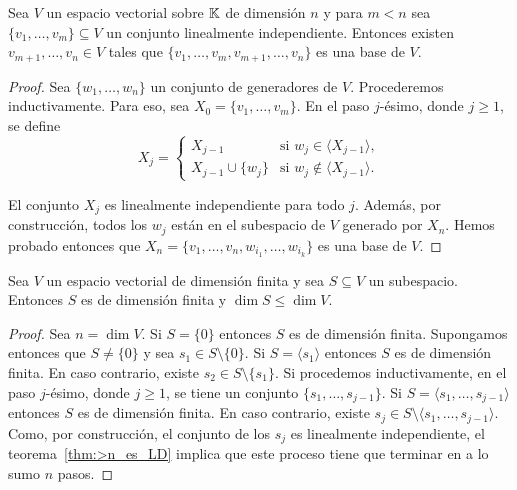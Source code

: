 \begin{prop}
	\label{pro:extender_a_una_base}
	Sea $V$ un espacio vectorial sobre $\mathbb{K}$ de dimensión $n$ y para $m<n$ sea
	$\{v_1,\dots,v_m\}\subseteq V$ un conjunto linealmente independiente.
	Entonces existen $v_{m+1},\dots,v_n\in V$ tales que
	$\{v_1,\dots,v_m,v_{m+1},\dots,v_n\}$ es una base de $V$.

	\begin{proof}
		Sea $\{w_1,\dots,w_n\}$ un conjunto de generadores de $V$.
		Procederemos inductivamente. Para eso, sea $X_0=\{v_1,\dots,v_m\}$. 
		En el paso $j$-ésimo, donde $j\geq1$, se define 
		\[
			X_j=\begin{cases}
				X_{j-1} & \text{si $w_j\in\langle X_{j-1}\rangle$},\\
				X_{j-1}\cup\{w_j\} & \text{si $w_j\not\in\langle X_{j-1}\rangle$}.
			\end{cases}
		\]

		El conjunto $X_j$ es linealmente independiente para todo $j$.  Además,
		por construcción, todos los $w_j$ están en el subespacio de $V$
		generado por $X_n$.  Hemos probado entonces que
		$X_n=\{v_1,\dots,v_n,w_{i_1},\dots,w_{i_k}\}$ es una base de $V$.
	\end{proof}
\end{prop}

\begin{prop}
	Sea $V$ un espacio vectorial de dimensión finita y sea $S\subseteq V$ un
	subespacio. Entonces $S$ es de dimensión finita y $\dim S\leq\dim V$.

	\begin{proof}
		Sea $n=\dim V$. Si $S=\{0\}$ entonces $S$ es de dimensión
		finita. Supongamos entonces que $S\ne\{0\}$ y sea $s_1\in
		S\setminus\{0\}$. Si $S=\langle s_1\rangle$ entonces $S$ es de
		dimensión finita. En caso contrario, existe $s_2\in S\setminus\{s_1\}$.
		Si procedemos inductivamente, en el paso $j$-ésimo, donde $j\geq1$, se
		tiene un conjunto $\{s_1,\dots,s_{j-1}\}$. Si $S=\langle
		s_1,\dots,s_{j-1}\rangle$ entonces $S$ es de dimensión finita. En caso
		contrario, existe $s_j\in S\setminus\langle s_1,\dots,s_{j-1}\rangle$.
		Como, por construcción, el conjunto de los $s_j$ es linealmente
		independiente, el teorema~\ref{thm:>n_es_LD} implica que este proceso
		tiene que terminar en a lo sumo $n$ pasos. 
	\end{proof}
\end{prop}

